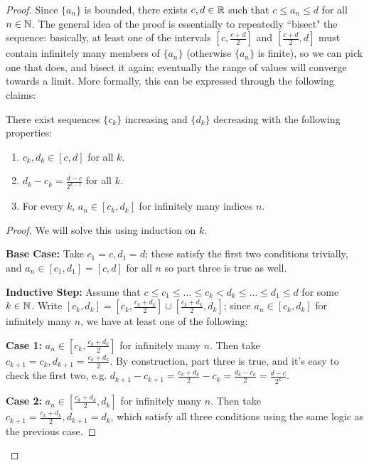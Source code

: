 \documentclass[main.tex]{subfiles}
\begin{document}
\begin{proof}
    Since $\{a_n\}$ is bounded, there exists $c, d\in \mathbb R$ such that $c\le a_n\le d$ for all $n\in \mathbb N$. The general idea of the proof is essentially to repeatedly ``bisect" the sequence: basically, at least one of the intervals $[c, \frac{c + d}{2}]$ and $[\frac{c + d}{2}, d]$ must contain infinitely many members of $\{a_n\}$ (otherwise $\{a_n\}$ is finite), so we can pick one that does, and bisect it again; eventually the range of values will converge towards a limit. More formally, this can be expressed through the following claims:
    \begin{claim}[Bisection]
    \label{bisection}
        There exist sequences $\{c_k\}$ increasing and $\{d_k\}$ decreasing with the following properties:
        \begin{enumerate}
            \item $c_k, d_k\in [c, d]$ for all $k$.
            \item $d_k - c_k = \frac{d - c}{2^{k - 1}}$ for all $k$.
            \item For every $k$, $a_n\in [c_k, d_k]$ for infinitely many indices $n$.
        \end{enumerate}
    \end{claim}

    \begin{proof}
        We will solve this using induction on $k$.

        \textbf{Base Case:} Take $c_1 = c, d_1 = d$; these satisfy the first two conditions trivially, and $a_n\in [c_1, d_1] = [c, d]$ for all $n$ so part three is true as well.

        \textbf{Inductive Step:} Assume that $c\le c_1 \le \ldots \le c_k < d_k \le \ldots \le d_1 \le d$ for some $k\in \mathbb N$. Write $[c_k, d_k] = \left[c_k, \frac{c_k + d_k}{2}\right] \cup \left[\frac{c_k + d_k}{2}, d_k\right]$; since $a_n\in [c_k, d_k]$ for infinitely many $n$, we have at least one of the following:

        \textbf{Case 1:} $a_n\in \left[c_k, \frac{c_k + d_k}{2}\right]$ for infinitely many $n$. Then take $c_{k + 1} = c_k, d_{k + 1} = \frac{c_k + d_k}{2}$. By construction, part three is true, and it's easy to check the first two, e.g. $d_{k + 1} - c_{k + 1} = \frac{c_k + d_k}{2} - c_k = \frac{d_k - c_k}{2} = \frac{d - c}{2^k}$.

        \textbf{Case 2:} $a_n\in  \left[\frac{c_k + d_k}{2}, d_k\right]$ for infinitely many $n$. Then take $c_{k + 1} = \frac{c_k + d_k}{2}, d_{k + 1} = d_k$, which satisfy all three conditions using the same logic as the previous case.


\end{proof}
\end{proof}
\end{document}
